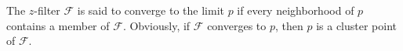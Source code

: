The $z$-filter $\mathcal{F}$ is said to converge to the limit $p$ if every neighborhood of $p$ contains a member of $\mathcal{F}$. Obviously, if $\mathcal{F}$ converges to $p$, then $p$ is a cluster point of $\mathcal{F}$.
